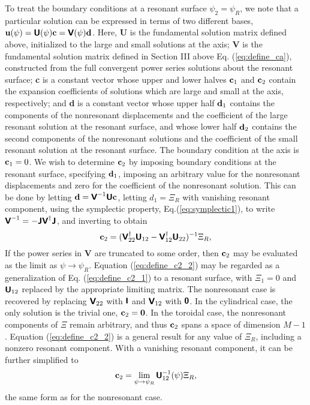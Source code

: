 \documentclass[prb,twocolumn,showpacs,preprintnumbers,amsmath,amssymb]{revtex4}
\renewcommand*{\v}[1]{\hbox{\bfseries #1}}
\renewcommand*{\t}[1]{\hbox{\sffamily\bfseries #1}}
\begin{document}
To treat the boundary conditions at a resonant surface $\psi_2 =
\psi_R$, we note that a particular solution can be expressed in terms of
two different bases, $\v{u}(\psi) = \t{U}(\psi) \v{c} = \t{V}(\psi)
\v{d}$.  Here, \t{U} is the fundamental solution matrix defined above,
initialized to the large and small solutions at the axis; \t{V} is the
fundamental solution matrix defined in Section III above
Eq. (\ref{eq:define_ca}), constructed from the full convergent power
series solutions about the resonant surface; \v{c} is a constant vector
whose upper and lower halves $\v{c}_1$ and $\v{c}_2$ contain the
expansion coefficients of solutions which are large and small at the
axis, respectively; and \v{d} is a constant vector whose upper half
$\v{d}_1$ contains the components of the nonresonant displacements and
the coefficient of the large resonant solution at the resonant surface,
and whose lower half $\v{d}_2$ contains the second components of the
nonresonant solutions and the coefficient of the small resonant solution
at the resonant surface.  The boundary condition at the axis is
$\v{c}_1=0$.  We wish to determine $\v{c}_2$ by imposing boundary
conditions at the resonant surface, specifying $\v{d}_1$, imposing an
arbitrary value for the nonresonant displacements and zero for the
coefficient of the nonresonant solution.  This can be done by letting
$\v{d} = \t{V}^{-1} \t{U}\v{c}$, letting $d_1 = \Xi_R$ with vanishing
resonant component, using the symplectic property,
Eq.(\ref{eq:symplectic1}), to write $\t{V}^{-1}=-\t{J} \t{V}^\dagger
\t{J}$, and inverting to obtain
\begin{equation}
\v{c}_2 = (\t{V}_{22}^\dagger
\t{U}_{12}-\t{V}_{12}^\dagger \t{U}_{22})^{-1} \Xi_R,
\label{eq:define_c2_2}
\end{equation}
If the power series in \t{V} are truncated to some order, then $\v{c}_2$
may be evaluated as the limit as $\psi \to \psi_R$.  Equation
(\ref{eq:define_c2_2}) may be regarded as a generalization of
Eq. (\ref{eq:define_c2_1}) to a resonant surface, with $\Xi_1=0$ and
$\t{U}_{12}$ replaced by the appropriate limiting matrix.  The
nonresonant case is recovered by replacing $\t{V}_{22}$ with $\t{I}$ and
$\t{V}_{12}$ with $\t{0}$.  In the cylindrical case, the only solution
is the trivial one, $\v{c}_2=\v{0}$.  In the toroidal case, the
nonresonant components of $\Xi$ remain arbitrary, and thus $\v{c}_2$
spans a space of dimension $M-1$.  Equation (\ref{eq:define_c2_2}) is a
general result for any value of $\Xi_R$, including a nonzero resonant
component.  With a vanishing resonant component, it can be further
simplified to
\begin{equation}
\v{c}_2 = \lim_{\psi \to \psi_R} \t{U}_{12}^{-1}(\psi) \Xi_R,
\label{eq:define_c2_3}
\end{equation}
the same form as for the nonresonant case.
\end{document}
